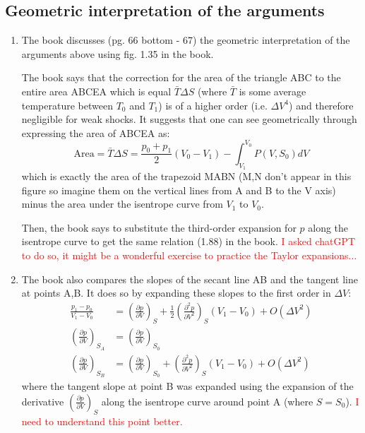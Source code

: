 ﻿\documentclass[11pt]{article}
\begin{document}
    \subsection{Geometric interpretation of the arguments}
    \begin{enumerate}
      \item The book discusses (pg. 66 bottom - 67) the geometric interpretation of the arguments above using fig. 1.35 in the book.
      \begin{center}
      \end{center}
      The book says that the correction for the area of the triangle ABC to the entire area ABCEA which is equal $\bar{T}\Delta S$ (where $\bar{T}$ is some average temperature between $T_0$ and $T_1$) is of a higher order (i.e. $\Delta V^4$) and therefore negligible for weak shocks.
      It suggests that one can see geometrically through expressing the area of ABCEA as:
      \begin{equation}
        \text{Area} = \bar{T}\Delta S = \frac{p_0 + p_1}{2}(V_0 - V_1) - \int_{V_1}^{V_0} P(V, S_0) dV
      \end{equation}
      which is exactly the area of the trapezoid MABN (M,N don't appear in this figure so imagine them on the vertical lines from A and B to the V axis) minus the area under the isentrope curve from $V_1$ to $V_0$.
      
      Then, the book says to substitute the third-order expansion for $p$ along the isentrope curve to get the same relation (1.88) in the book.
      \textcolor{red}{I asked chatGPT to do so, it might be a wonderful exercise to practice the Taylor expansions...}

      \item The book also compares the slopes of the secant line AB and the tangent line at points A,B. It does so by expanding these slopes to the first order in $\Delta V$:
      \begin{align}
        \frac{p_1 - p_0}{V_1 - V_0} &= \left( \frac{\partial p}{\partial V} \right)_S + \frac{1}{2} \left( \frac{\partial^2 p}{\partial V^2} \right)_S (V_1 - V_0) + O(\Delta V^2) \\
        \left( \frac{\partial p}{\partial V} \right)_{S_A} &= \left( \frac{\partial p}{\partial V} \right)_{S_0} \\ 
        \left( \frac{\partial p}{\partial V} \right)_{S_B} &= \left( \frac{\partial p}{\partial V} \right)_{S_0} + \left( \frac{\partial^2 p}{\partial V^2} \right)_S (V_1 - V_0) + O(\Delta V^2)
      \end{align}
      where the tangent slope at point B was expanded using the expansion of the derivative $\left( \frac{\partial p}{\partial V} \right)_S$ along the isentrope curve around point A (where $S=S_0$). \textcolor{red}{I need to understand this point better.}


\end{enumerate}
\end{document}
